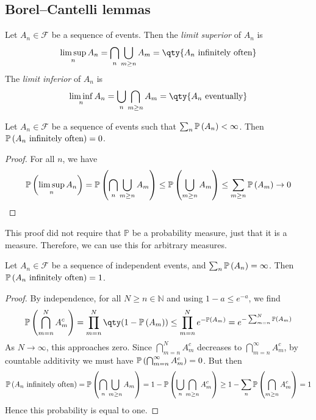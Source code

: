 \subsection{Borel--Cantelli lemmas}
\begin{definition}
	Let $A_n \in \mathcal F$ be a sequence of events.
	Then the \emph{limit superior} of $A_n$ is
	\[ \limsup_n A_n = \bigcap_n \bigcup_{m \geq n} A_m = \qty{A_n \text{ infinitely often}} \]
	The \emph{limit inferior} of $A_n$ is
	\[ \liminf_n A_n = \bigcup_n \bigcap_{m \geq n} A_m = \qty{A_n \text{ eventually}} \]
\end{definition}
\begin{lemma}
	Let $A_n \in \mathcal F$ be a sequence of events such that $\sum_n \mathbb{P}\left({A_n}\right) < \infty$.
	Then $\mathbb{P}\left({A_n \text{ infinitely often}}\right) = 0$.
\end{lemma}
\begin{proof}
	For all $n$, we have
	\[ \mathbb{P}\left({\limsup_n A_n}\right) = \mathbb{P}\left({\bigcap_n \bigcup_{m \geq n} A_m}\right) \leq \mathbb{P}\left({\bigcup_{m \geq n} A_m}\right) \leq \sum_{m \geq n} \mathbb{P}\left({A_m}\right) \to 0 \]
\end{proof}
This proof did not require that $\mathbb P$ be a probability measure, just that it is a measure.
Therefore, we can use this for arbitrary measures.
\begin{lemma}
	Let $A_n \in \mathcal F$ be a sequence of independent events, and $\sum_n \mathbb{P}\left({A_n}\right) = \infty$.
	Then $\mathbb{P}\left({A_n \text{ infinitely often}}\right) = 1$.
\end{lemma}
\begin{proof}
	By independence, for all $N \geq n \in \mathbb N$ and using $1 - a \leq e^{-a}$, we find
	\[ \prob{\bigcap_{m=n}^N A_m^c} = \prod_{m=n}^N \qty(1 - \prob{A_m}) \leq \prod_{m=n}^N e^{-\prob{A_m}} = e^{-\sum_{m=n}^N \prob{A_m}} \]
	As $N \to \infty$, this approaches zero.
	Since $\bigcap_{m=n}^N A_m^c$ decreases to $\bigcap_{m=n}^\infty A_m^c$, by countable additivity we must have $\mathbb{P}\left({\bigcap_{m=n}^\infty A_m^c}\right) = 0$.
	But then
	\[ \mathbb{P}\left({A_n \text{ infinitely often}}\right) = \mathbb{P}\left({\bigcap_n \bigcup_{m \geq n} A_m}\right) = 1 - \mathbb{P}\left({\bigcup_n \bigcap_{m \geq n} A_m^c}\right) \geq 1 - \sum_n \mathbb{P}\left({\bigcap_{m \geq n} A_m^c}\right) = 1 \]
	Hence this probability is equal to one.
\end{proof}

